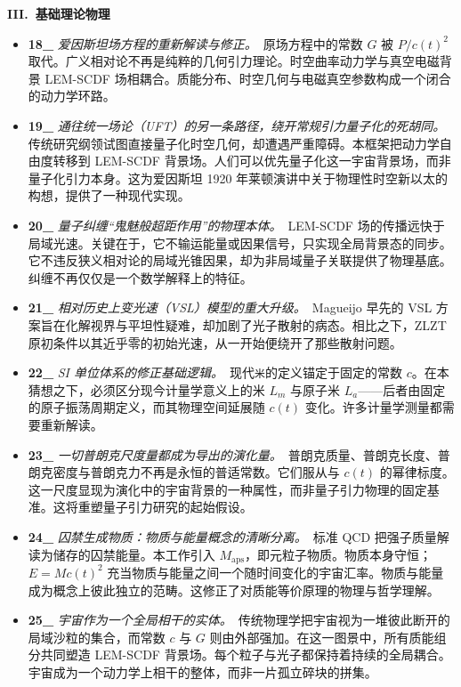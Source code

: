 \documentclass[12pt,leqno]{article}
\begin{document}
		
	\medskip
	\bigskip
	\textbf{III.\ 基础理论物理}
	\begin{itemize}
		\item \textbf{18\_} \textit{爱因斯坦场方程的重新解读与修正。}\,\,\,原场方程中的常数 $G$ 被 $P/c(t)^2$ 取代。广义相对论不再是纯粹的几何引力理论。时空曲率动力学与真空电磁背景 LEM-SCDF 场相耦合。质能分布、时空几何与电磁真空参数构成一个闭合的动力学环路。
		
		\item \textbf{19\_} \textit{通往统一场论（UFT）的另一条路径，绕开常规引力量子化的死胡同。}\,\,\,传统研究纲领试图直接量子化时空几何，却遭遇严重障碍。本框架把动力学自由度转移到 LEM-SCDF 背景场。人们可以优先量子化这一宇宙背景场，而非量子化引力本身。这为爱因斯坦 1920 年莱顿演讲中关于物理性时空新以太的构想，提供了一种现代实现。
		
		\item \textbf{20\_} \textit{量子纠缠“鬼魅般超距作用”的物理本体。}\,\,\,LEM-SCDF 场的传播远快于局域光速。关键在于，它不输运能量或因果信号，只实现全局背景态的同步。它不违反狭义相对论的局域光锥因果，却为非局域量子关联提供了物理基底。纠缠不再仅仅是一个数学解释上的特征。
		
		\item \textbf{21\_} \textit{相对历史上变光速（VSL）模型的重大升级。}\,\,\,Magueijo 早先的 VSL 方案旨在化解视界与平坦性疑难，却加剧了光子散射的病态。相比之下，ZLZT 原初条件以其近乎零的初始光速，从一开始便绕开了那些散射问题。
		
		\item \textbf{22\_} \textit{SI 单位体系的修正基础逻辑。}\,\,\,现代\texttt{米}的定义锚定于固定的常数 $c$。在本猜想之下，必须区分现今计量学意义上的米 $L_m$ 与原子米 $L_a$——后者由固定的原子振荡周期定义，而其物理空间延展随 $c(t)$ 变化。许多计量学测量都需要重新解读。 
		
		\item \textbf{23\_} \textit{一切普朗克尺度量都成为导出的演化量。}\,\,\,普朗克质量、普朗克长度、普朗克密度与普朗克力不再是永恒的普适常数。它们服从与 $c(t)$ 的幂律标度。这一尺度显现为演化中的宇宙背景的一种属性，而非量子引力物理的固定基准。这将重塑量子引力研究的起始假设。
		
		\item \textbf{24\_} \textit{囚禁生成物质：物质与能量概念的清晰分离。}\,\,\,标准 QCD 把强子质量解读为储存的囚禁能量。本工作引入 $M_\mathrm{aps}$，即元粒子物质。物质本身守恒；$E = M c(t)^2$ 充当物质与能量之间一个随时间变化的宇宙汇率。物质与能量成为概念上彼此独立的范畴。这修正了对质能等价原理的物理与哲学理解。
		
		\item \textbf{25\_} \textit{宇宙作为一个全局相干的实体。}\,\,\,传统物理学把宇宙视为一堆彼此断开的局域沙粒的集合，而常数 $c$ 与 $G$ 则由外部强加。在这一图景中，所有质能组分共同塑造 LEM-SCDF 背景场。每个粒子与光子都保持着持续的全局耦合。宇宙成为一个动力学上相干的整体，而非一片孤立碎块的拼集。
	\end{itemize}
	
\end{document}
